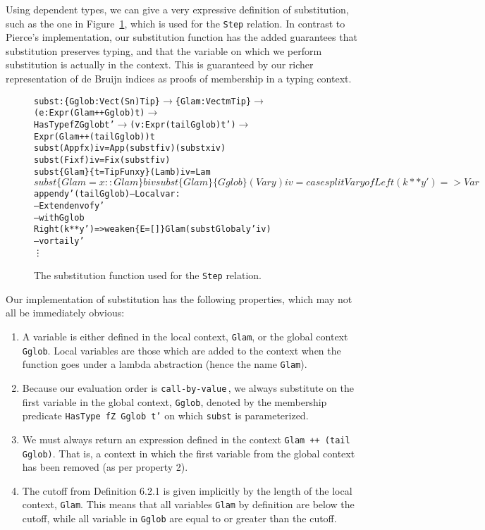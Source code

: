 Using dependent types, we can give a very expressive definition of substitution, such as the one in Figure~\ref{fig:subst}, which is used for the \texttt{Step} relation. In contrast to Pierce's implementation, our substitution function has the added guarantees that substitution preserves typing, and that the variable on which we perform substitution is actually in the context. This is guaranteed by our richer representation of de Bruijn indices as proofs of membership in a typing context.  
\begin{figure}
\begin{alltt}
subst : \{Gglob : Vect (S n) Tip\} \(\rightarrow\) \{Glam: Vect m Tip\} \(\rightarrow\) 
                 (e: Expr (Glam ++ Gglob) t) \(\rightarrow\) 
                 HasType fZ Gglob t' \(\rightarrow\) (v: Expr (tail Gglob) t') \(\rightarrow\) 
                 Expr (Glam ++ (tail Gglob)) t
subst                     (App f x) i v = App (subst f i v) (subst x i v)
subst                       (Fix f) i v = Fix (subst f i v)
subst \{Glam\} \{t=TipFun x y\} (Lam b) i v = Lam $ subst \{Glam=x::Glam\} b i v
subst \{Glam\} \{Gglob\}        (Var y) i v = 
  case splitVar y of
    Left  (k ** y') => Var $ append y' (tail Gglob) -- Local var: 
                                                    -- Extend env of y'
                                                    -- with Gglob
    Right (k ** y') => weaken \{E=[]\} Glam (substGlobal y' i v) 
                                                    -- v or tail y'
\vdots
\end{alltt}
\caption{The substitution function used for the \texttt{Step} relation.}
\label{fig:subst}
\end{figure}
Our implementation of substitution has the following properties, which may not all be immediately obvious:
\begin{enumerate}
\item A variable is either defined in the local context, \texttt{Glam}, or the global context \texttt{Gglob}. Local variables are those which are added to the context when the function goes under a lambda abstraction (hence the name \texttt{Glam}).
\item Because our evaluation order is \texttt{call-by-value}\,\cite[pp. 57-58]{Pierce:TypeSystems}, we always substitute on the first variable in the global context, \texttt{Gglob}, denoted by the membership predicate \texttt{HasType fZ Gglob t'} on which \texttt{subst} is parameterized. 
\item We must always return an expression defined in the context \texttt{Glam~++~(tail Gglob)}. That is, a context in which the first variable from the global context has been removed (as per property 2).
\item The cutoff from Definition 6.2.1 is given implicitly by the length of the local context, \texttt{Glam}. This means that all variables \texttt{Glam} by definition are below the cutoff, while all variable in \texttt{Gglob} are equal to or greater than the cutoff.
\end{enumerate}

